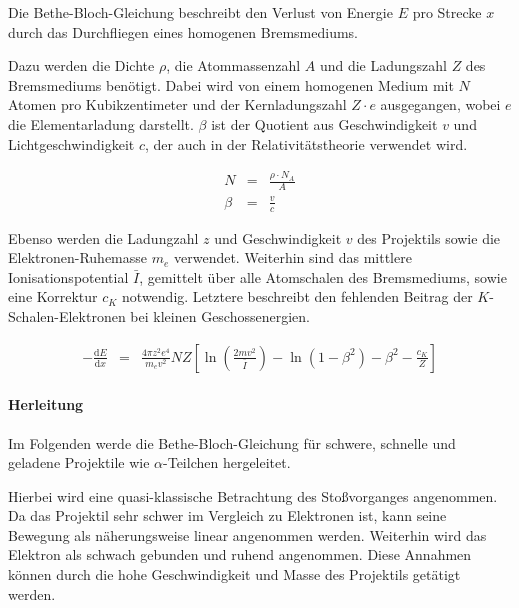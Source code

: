 \documentclass[12pt,a4paper]{scrartcl}
\numberwithin{equation}{section} %
\renewcommand{\[}{} %
\renewcommand{\]}{\noindent} %
\begin{document}
Die Bethe-Bloch-Gleichung beschreibt den Verlust von Energie \(E\) pro
Strecke \(x\) durch das Durchfliegen eines homogenen Bremsmediums.

Dazu werden die Dichte \(\rho\), die Atommassenzahl \(A\) und die
Ladungszahl \(Z\) des Bremsmediums benötigt. Dabei wird von einem
homogenen Medium mit \(N\) Atomen pro Kubikzentimeter und der
Kernladungszahl \(Z\cdot e\) ausgegangen, wobei \(e\) die
Elementarladung darstellt. \(\beta\) ist der Quotient aus
Geschwindigkeit \(v\) und Lichtgeschwindigkeit \(c\), der auch in der
Relativitätstheorie verwendet wird.

\[
\begin{eqnarray}
    N &=& \frac{\rho\cdot N_A}{A} \\
    \beta &=& \frac{v}{c}
\end{eqnarray}
\]

Ebenso werden die Ladungzahl \(z\) und Geschwindigkeit \(v\) des
Projektils sowie die Elektronen-Ruhemasse \(m_e\) verwendet. Weiterhin
sind das mittlere Ionisationspotential \(\bar I\), gemittelt über alle
Atomschalen des Bremsmediums, sowie eine Korrektur \(c_K\) notwendig.
Letztere beschreibt den fehlenden Beitrag der \(K\)-Schalen-Elektronen
bei kleinen Geschossenergien.

\[
\begin{eqnarray}
    -\frac{\mathrm dE}{\mathrm dx} &=&
        \frac{4\pi z^2 e^4}{m_e v^2} NZ
        \left[
            \ln\left(\frac{2mv^2}{\bar I}\right)
            - \ln\left(1 - \beta^2\right)
            - \beta^2
            - \frac{c_K}{Z}
        \right]
        \label{BetheBloch}
\end{eqnarray}
\]

\hypertarget{herleitung}{%
\paragraph{Herleitung}\label{herleitung}}

Im Folgenden werde die Bethe-Bloch-Gleichung für schwere, schnelle und
geladene Projektile wie \(\alpha\)-Teilchen hergeleitet.

Hierbei wird eine quasi-klassische Betrachtung des Stoßvorganges
angenommen. Da das Projektil sehr schwer im Vergleich zu Elektronen ist,
kann seine Bewegung als näherungsweise linear angenommen werden.
Weiterhin wird das Elektron als schwach gebunden und ruhend angenommen.
Diese Annahmen können durch die hohe Geschwindigkeit und Masse des
Projektils getätigt werden.
\end{document}
